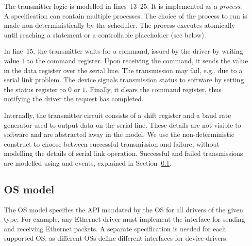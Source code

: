 The transmitter logic is modelled in lines~13--25.  It is implemented as a \tsl \emph{process}.  A \tsl specification can contain multiple processes.  The choice of the process to run is made non-deterministically by the scheduler.  The process executes atomically until reaching a  statement or a controllable placeholder (see below).

In line~15, the transmitter waits for a command, issued by the driver by writing value $1$ to the command register.  Upon receiving the command, it sends the value in the data register over the serial line.  The transmission may fail, e.g., due to a serial link problem.  The device signals transmission status to software by setting the status register to $0$ or $1$.  Finally, it clears the command register, thus notifying the driver the request has completed.

Internally, the transmitter circuit consists of a shift register and a baud rate generator used to output data on the serial line.  These details are not visible to software and are abstracted away in the model.  We use the non-deterministic  construct to choose between successful transmission and failure, without modelling the details of serial link operation.  Successful and failed transmissions are modelled using and  events, explained in Section~\ref{s:os}.

%

\subsection{OS model}\label{s:os}

The OS model specifies the API mandated by the OS for all drivers of the given type.  For example, any Ethernet driver must implement the interface for sending and receiving Ethernet packets.  A separate specification is needed for each supported OS, as different OSs define different interfaces for device drivers.

